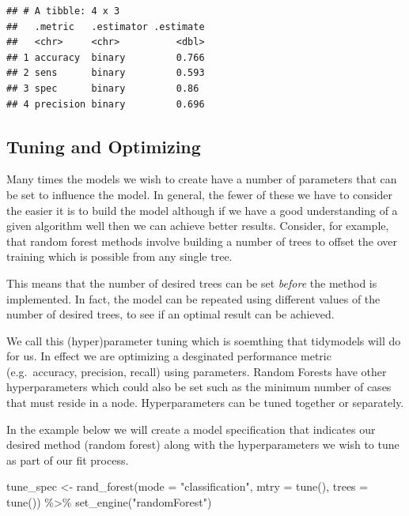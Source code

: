\documentclass[
]{article}
\newenvironment{Shaded}{\begin{snugshade}}{\end{snugshade}}
\newcommand{\AttributeTok}[1]{\textcolor[rgb]{0.77,0.63,0.00}{#1}}
\newcommand{\FunctionTok}[1]{\textcolor[rgb]{0.00,0.00,0.00}{#1}}
\newcommand{\NormalTok}[1]{#1}
\newcommand{\OtherTok}[1]{\textcolor[rgb]{0.56,0.35,0.01}{#1}}
\newcommand{\SpecialCharTok}[1]{\textcolor[rgb]{0.00,0.00,0.00}{#1}}
\newcommand{\StringTok}[1]{\textcolor[rgb]{0.31,0.60,0.02}{#1}}
\begin{document}
\begin{verbatim}
## # A tibble: 4 x 3
##   .metric   .estimator .estimate
##   <chr>     <chr>          <dbl>
## 1 accuracy  binary         0.766
## 2 sens      binary         0.593
## 3 spec      binary         0.86 
## 4 precision binary         0.696
\end{verbatim}

\hypertarget{tuning-and-optimizing}{%
\subsection{Tuning and Optimizing}\label{tuning-and-optimizing}}

Many times the models we wish to create have a number of parameters that
can be set to influence the model. In general, the fewer of these we
have to consider the easier it is to build the model although if we have
a good understanding of a given algorithm well then we can achieve
better results. Consider, for example, that random forest methods
involve building a number of trees to offset the over training which is
possible from any single tree.

This means that the number of desired trees can be set \emph{before} the
method is implemented. In fact, the model can be repeated using
different values of the number of desired trees, to see if an optimal
result can be achieved.

We call this (hyper)parameter tuning which is soemthing that tidymodels
will do for us. In effect we are optimizing a desginated performance
metric (e.g.~accuracy, precision, recall) using parameters. Random
Forests have other hyperparameters which could also be set such as the
minimum number of cases that must reside in a node. Hyperparameters can
be tuned together or separately.

In the example below we will create a model specification that indicates
our desired method (random forest) along with the hyperparameters we
wish to tune as part of our fit process.

\begin{Shaded}
\begin{Highlighting}[]
\NormalTok{tune\_spec }\OtherTok{\textless{}{-}} 
  \FunctionTok{rand\_forest}\NormalTok{(}\AttributeTok{mode =} \StringTok{"classification"}\NormalTok{,}
              \AttributeTok{mtry =} \FunctionTok{tune}\NormalTok{(),}
              \AttributeTok{trees =} \FunctionTok{tune}\NormalTok{()) }\SpecialCharTok{\%\textgreater{}\%}
  \FunctionTok{set\_engine}\NormalTok{(}\StringTok{"randomForest"}\NormalTok{)}
\end{Highlighting}
\end{Shaded}
\end{document}
